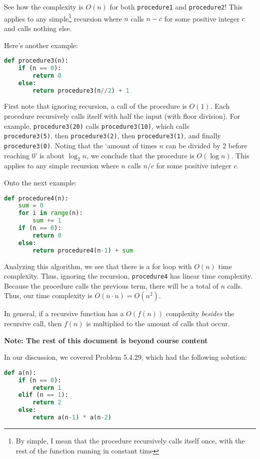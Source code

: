 \documentclass[11pt,letterpaper,dvipsnames]{article}
\begin{document}
See how the complexity is $O(n)$ for both \texttt{procedure1} and \texttt{procedure2}! This applies to any simple\footnote{By simple, I mean that the procedure recursively calls itself once, with the rest of the function running in constant time} recursion where $n$ calls $n-c$ for some positive integer $c$ and calls nothing else.

Here's another example:
\begin{lstlisting}[language=Python]    
def procedure3(n):
    if (n == 0):
        return 0
    else:
        return procedure3(n//2) + 1
\end{lstlisting}

First note that ignoring recursion, a call of the procedure is $O(1)$. Each procedure recursively calls itself with half the input (with floor division). For example, \texttt{procedure3(20)} calls \texttt{procedure3(10)}, which calls \\\texttt{procedure3(5)}, then \texttt{procedure3(2)}, then \texttt{procedure3(1)}, and finally \texttt{procedure3(0)}. Noting that the `amount of times $n$ can be divided by 2 before reaching 0' is about $\log_2{n}$, we conclude that the procedure is $O(\log n)$. This applies to any simple recursion where $n$ calls $n/c$ for some positive integer $c$.

\newpage
Onto the next example:
\begin{lstlisting}[language=Python]    
def procedure4(n):
    sum = 0
    for i in range(n):
        sum += 1
    if (n == 0):
        return 0
    else:
        return procedure4(n-1) + sum
\end{lstlisting}

Analyzing this algorithm, we see that there is a for loop with $O(n)$ time complexity. Thus, ignoring the recursion, \texttt{procedure4} has linear time complexity. Because the procedure calls the previous term, there will be a total of $n$ calls. Thus, our time complexity is $O(n\cdot n)=O(n^2)$.

In general, if a recursive function has a $O(f(n))$ complexity \textit{besides} the recursive call, then $f(n)$ is multiplied to the amount of calls that occur.

\vspace{5mm}
\textbf{Note: The rest of this document is beyond course content}

In our discussion, we covered Problem 5.4.29, which had the following solution:
\begin{lstlisting}[language=Python]    
def a(n):
    if (n == 0):
        return 1
    elif (n == 1):
        return 2
    else:
        return a(n-1) * a(n-2)
\end{lstlisting}
\end{document}
